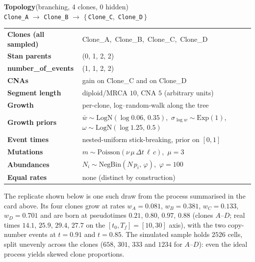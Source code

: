 \begin{tcolorbox}[colback=white, colframe=procblue, boxrule=0.5pt, arc=2pt,
  coltitle=white, colbacktitle=procblue, fonttitle=\bfseries\large,
  title={Ideal DGP \hfill \normalfont\normalsize Nnodes=4 \ \textbar\ Nevents=6 \ \textbar\ Nequations=8}]

\begin{tcolorbox}[colback=white, colframe=procblue!55, boxrule=0.4pt, arc=1pt,
  left=3pt,right=3pt,top=3pt,bottom=3pt]
\textbf{Topology}\quad (branching, 4 clones, 0 hidden)\\[3pt]
\texttt{Clone\_A} $\longrightarrow$ \texttt{Clone\_B} $\longrightarrow$ $\big\{\,$\texttt{Clone\_C},\ \texttt{Clone\_D}$\,\big\}$
\end{tcolorbox}

\vspace{4pt}
{\small
\begin{tabular}{@{}ll@{}}
\toprule
\textbf{Clones (all sampled)} & Clone\_A,\ Clone\_B,\ Clone\_C,\ Clone\_D \\
\textbf{Stan parents}         & (0, 1, 2, 2) \\
\textbf{number\_of\_events}   & (1, 1, 2, 2) \\
\midrule
\textbf{CNAs}                 & gain on Clone\_C and on Clone\_D \\
\textbf{Segment length}       & diploid/MRCA $10$, CNA $5$ (arbitrary units) \\
\midrule
\textbf{Growth}               & per-clone, log--random-walk along the tree \\
\textbf{Growth priors}        & $\bar w\sim\mathrm{LogN}(\log 0.06,\,0.35)$,\ $\sigma_{\log w}\sim\mathrm{Exp}(1)$,\ $\omega\sim\mathrm{LogN}(\log 1.25,\,0.5)$ \\
\textbf{Event times}          & nested-uniform stick-breaking, prior on $[0,1]$ \\
\textbf{Mutations}            & $m\sim\mathrm{Poisson}(\nu\,\mu\,\Delta t\,\ell\,c)$,\ $\mu=3$ \\
\textbf{Abundances}           & $N_i\sim\mathrm{NegBin}(N\,p_i,\,\varphi)$,\ $\varphi=100$ \\
\textbf{Equal rates}          & none (distinct by construction) \\
\bottomrule
\end{tabular}}
\end{tcolorbox}

The replicate shown below is one such draw from the process summarised in the card
above. Its four clones grow at rates $w_A=0.081$, $w_B=0.381$, $w_C=0.133$,
$w_D=0.701$ and are born at pseudotimes $0.21$, $0.80$, $0.97$, $0.88$ (clones
$A$--$D$; real times $14.1$, $25.9$, $29.4$, $27.7$ on the $[t_0,T_f]=[10,30]$ axis),
with the two copy-number events at $t=0.91$ and $t=0.85$. The simulated sample holds
$2526$ cells, split unevenly across the clones ($658$, $301$, $333$ and $1234$
for $A$--$D$): even the ideal process yields skewed clone proportions.

